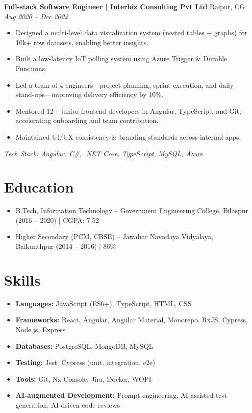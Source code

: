 \documentclass[a4paper,10pt]{article}
\begin{document}
\vspace{1em}

\textbf{Full-stack Software Engineer | Interbiz Consulting Pvt Ltd} \hfill Raipur, CG \quad \textit{Aug 2020 – Dec 2022}

\begin{itemize}
  \item Designed a multi-level data visualization system (nested tables + graphs) for 10k+ row datasets, enabling better insights.
  \item Built a low-latency IoT polling system using Azure Trigger \& Durable Functions.
  \item Led a team of 4 engineers—project planning, sprint execution, and daily stand-ups—improving delivery efficiency by 10\%.
  \item Mentored 12+ junior frontend developers in Angular, TypeScript, and Git, accelerating onboarding and team contribution.
  \item Maintained UI/UX consistency \& branding standards across internal apps.
\end{itemize}

\textit{Tech Stack: Angular, C\#, .NET Core, TypeScript, MySQL, Azure}

\section{Education}
\begin{itemize}
  \item B.Tech, Information Technology – Government Engineering College, Bilaspur (2016 – 2020) | CGPA: 7.52
  \item Higher Secondary (PCM, CBSE) – Jawahar Navodaya Vidyalaya, Baikunthpur (2014 – 2016) | 86\%
\end{itemize}

\section{Skills}
\begin{itemize}
  \item \textbf{Languages:} JavaScript (ES6+), TypeScript, HTML, CSS
  \item \textbf{Frameworks:} React, Angular, Angular Material, Monorepo, RxJS, Cypress, Node.js, Express
  \item \textbf{Databases:} PostgreSQL, MongoDB, MySQL
  \item \textbf{Testing:} Jest, Cypress (unit, integration, e2e)
  \item \textbf{Tools:} Git, Nx Console, Jira, Docker, WOPI
  \item \textbf{AI-augmented Development:} Prompt engineering, AI-assisted test generation, AI-driven code reviews
\end{itemize}
\end{document}
